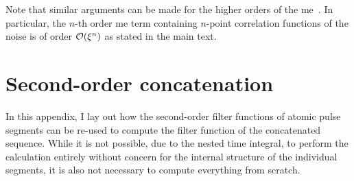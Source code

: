 Note that similar arguments can be made for the higher orders of the \gls{me}~\cite{Green2013}.
In particular, the $n$-th order \gls{me} term containing $n$-point correlation functions of the noise is of order $\order{\xi^n}$ as stated in the main text.

\section{Second-order concatenation}\label{sec:app:ff:concatenation}
In this appendix, I lay out how the second-order filter functions of atomic pulse segments can be re-used to compute the filter function of the concatenated sequence.
While it is not possible, due to the nested time integral, to perform the calculation entirely without concern for the internal structure of the individual segments, it is also not necessary to compute everything from scratch.
